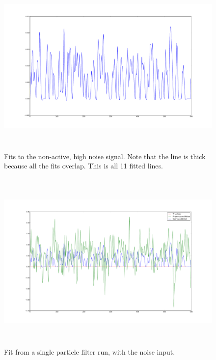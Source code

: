 \begin{figure}[H]
\centering
\includegraphics[clip=true,trim=6cm 3cm 6cm 3cm,height=9cm]{images/fits_noiseonly_high}
\caption{Fits to the non-active, high noise signal. Note that the line is thick because all
the fits overlap. This is all 11 fitted lines.}
\label{fig:fits_noiseonly_high}
\end{figure}

\begin{figure}[H]
\centering
\includegraphics[clip=true,trim=6cm 3cm 6cm 3cm,height=9cm]{images/justbignoise_fit_0}
\caption{Fit from a single particle filter run, with the noise input. }
\label{fig:justbignoise_fit_0}
\end{figure} %

